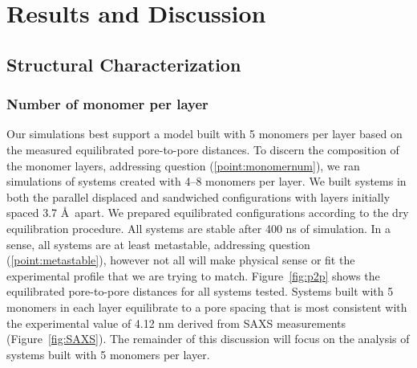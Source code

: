 \documentclass[journal=jpcbfk,manusciprt=article]{achemso}
\begin{document}
  \section{Results and Discussion}
  
  \subsection{Structural Characterization}
  
  \subsubsection{Number of monomer per layer}

  Our simulations best support a model built with 5 monomers per layer based on
  the measured equilibrated pore-to-pore distances. To discern the composition of
  the monomer layers, addressing question (\ref{point:monomernum}), we ran
  simulations of systems created with 4--8 monomers per layer. We built systems
  in both the parallel displaced and sandwiched configurations with layers
  initially spaced 3.7 \AA~apart. We prepared equilibrated configurations
  according to the dry equilibration procedure. All systems are stable after 400
  ns of simulation. 
In a sense, all systems are at least metastable, addressing
  question (\ref{point:metastable}), however not all will make physical sense or fit
  the experimental profile that we are trying to match. Figure~\ref{fig:p2p}
  shows 
the equilibrated pore-to-pore distances 
for all systems tested. 
Systems built with 5 monomers in
  each layer equilibrate to a pore spacing that is most consistent with the
  experimental value of 4.12 nm derived from SAXS measurements
  (Figure~\ref{fig:SAXS}). 
The remainder of this discussion will focus on the
  analysis of systems built with 5 monomers per layer.
\end{document}

